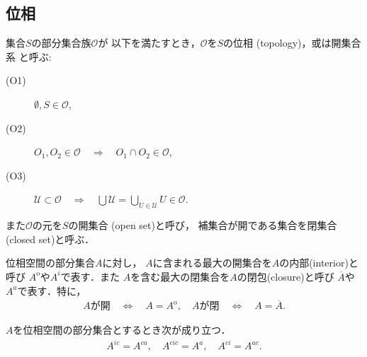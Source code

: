 \subsection{位相}
	\begin{screen}
		\begin{dfn}[位相]
			集合$S$の部分集合族$\mathscr{O}$が
			以下を満たすとき，$\mathscr{O}$を$S$の位相
			(topology)，或は開集合系
			と呼ぶ:
			\begin{description}
				\item[(O1)] $\emptyset, S \in \mathscr{O}$,
				\item[(O2)] $O_1,O_2 \in \mathscr{O} 
					\quad \Longrightarrow \quad O_1 \cap O_2 \in \mathscr{O}$,
				\item[(O3)] $\displaystyle\mathscr{U} \subset \mathscr{O}
					\quad \Longrightarrow \quad \bigcup \mathscr{U} = 
					\bigcup_{U \in \mathscr{U}} U \in \mathscr{O}$.
			\end{description}
			また$\mathscr{O}$の元を$S$の開集合
			(open set)と呼び，
			補集合が開である集合を閉集合(closed set)と呼ぶ．
		\end{dfn}
	\end{screen}
	
	\begin{screen}
		\begin{dfn}[内部・閉包]
			位相空間の部分集合$A$に対し，
			$A$に含まれる最大の開集合を$A$の内部(interior)と呼び
			$A^{\mathrm{o}}$や$A^i$で表す．また
			$A$を含む最大の閉集合を$A$の閉包(closure)と呼び
			$\overline{A}$や$A^a$で表す．特に，
			\begin{align}
				\mbox{$A$が開} \quad \Longleftrightarrow \quad
				A = A^\mathrm{o},
				\quad \mbox{$A$が閉} \quad \Longleftrightarrow \quad
				A = \overline{A}.
				\label{eq:dfn_interior_closure}
			\end{align}
		\end{dfn}
	\end{screen}
	
	\begin{screen}
		\begin{thm}[内部の補集合は補集合の閉包]
		\label{thm:topology_note_closure_interior}
			$A$を位相空間の部分集合とするとき次が成り立つ．
			\begin{align}
				A^{ic} = A^{ca},
				\quad A^{cic} = A^a,
				\quad A^{ci} = A^{ac}.
			\end{align}
		\end{thm}
	\end{screen}
	
